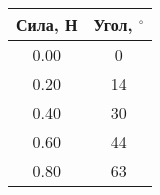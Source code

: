 \begin{tabular}{|c|c|}
\hline
Сила, Н & Угол, $^\circ$ \\ \hline
0.00 & 0 \\ \hline
0.20 & 14 \\ \hline
0.40 & 30 \\ \hline
0.60 & 44 \\ \hline
0.80 & 63 \\ \hline
\end{tabular}
